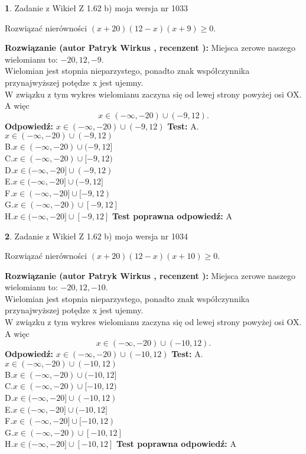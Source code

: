 \documentclass[12pt, a4paper]{article}
\theoremstyle{definition} %
\newtheorem{zad}{}
\newcommand{\zadStart}[1]{\begin{zad}#1\newline}
\newcommand{\zadStop}{\end{zad}}
\newcommand{\rozwStart}[2]{\noindent \textbf{Rozwiązanie (autor #1 , recenzent #2): }\newline}
\newcommand{\rozwStop}{\newline}
\newcommand{\odpStart}{\noindent \textbf{Odpowiedź:}\newline}
\newcommand{\odpStop}{\newline}
\newcommand{\testStart}{\noindent \textbf{Test:}\newline}
\newcommand{\testStop}{\newline}
\newcommand{\kluczStart}{\noindent \textbf{Test poprawna odpowiedź:}\newline}
\newcommand{\kluczStop}{\newline}
\begin{document}
\zadStart{Zadanie z Wikieł Z 1.62 b) moja wersja nr 1033}

Rozwiązać nierówności $(x+20)(12-x)(x+9)\ge0$.
\zadStop
\rozwStart{Patryk Wirkus}{}
Miejsca zerowe naszego wielomianu to: $-20, 12, -9$.\\
Wielomian jest stopnia nieparzystego, ponadto znak współczynnika przy\linebreak najwyższej potędze x jest ujemny.\\ W związku z tym wykres wielomianu zaczyna się od lewej strony powyżej osi OX. A więc $$x \in (-\infty,-20) \cup (-9,12).$$
\rozwStop
\odpStart
$x \in (-\infty,-20) \cup (-9,12)$
\odpStop
\testStart
A.$x \in (-\infty,-20) \cup (-9,12)$\\
B.$x \in (-\infty,-20) \cup (-9,12]$\\
C.$x \in (-\infty,-20) \cup [-9,12)$\\
D.$x \in (-\infty,-20] \cup (-9,12)$\\
E.$x \in (-\infty,-20] \cup (-9,12]$\\
F.$x \in (-\infty,-20] \cup [-9,12)$\\
G.$x \in (-\infty,-20) \cup [-9,12]$\\
H.$x \in (-\infty,-20] \cup [-9,12]$
\testStop
\kluczStart
A
\kluczStop



\zadStart{Zadanie z Wikieł Z 1.62 b) moja wersja nr 1034}

Rozwiązać nierówności $(x+20)(12-x)(x+10)\ge0$.
\zadStop
\rozwStart{Patryk Wirkus}{}
Miejsca zerowe naszego wielomianu to: $-20, 12, -10$.\\
Wielomian jest stopnia nieparzystego, ponadto znak współczynnika przy\linebreak najwyższej potędze x jest ujemny.\\ W związku z tym wykres wielomianu zaczyna się od lewej strony powyżej osi OX. A więc $$x \in (-\infty,-20) \cup (-10,12).$$
\rozwStop
\odpStart
$x \in (-\infty,-20) \cup (-10,12)$
\odpStop
\testStart
A.$x \in (-\infty,-20) \cup (-10,12)$\\
B.$x \in (-\infty,-20) \cup (-10,12]$\\
C.$x \in (-\infty,-20) \cup [-10,12)$\\
D.$x \in (-\infty,-20] \cup (-10,12)$\\
E.$x \in (-\infty,-20] \cup (-10,12]$\\
F.$x \in (-\infty,-20] \cup [-10,12)$\\
G.$x \in (-\infty,-20) \cup [-10,12]$\\
H.$x \in (-\infty,-20] \cup [-10,12]$
\testStop
\kluczStart
A
\kluczStop
\end{document}
